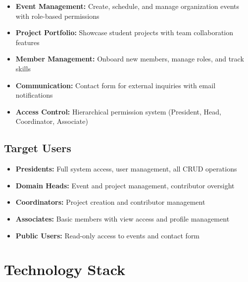 \documentclass[11pt,a4paper]{article}
\begin{document}
\begin{itemize}[leftmargin=*]
    \item \textbf{Event Management:} Create, schedule, and manage organization events with role-based permissions
    \item \textbf{Project Portfolio:} Showcase student projects with team collaboration features
    \item \textbf{Member Management:} Onboard new members, manage roles, and track skills
    \item \textbf{Communication:} Contact form for external inquiries with email notifications
    \item \textbf{Access Control:} Hierarchical permission system (President, Head, Coordinator, Associate)
\end{itemize}

\subsection{Target Users}
\begin{itemize}[leftmargin=*]
    \item \textbf{Presidents:} Full system access, user management, all CRUD operations
    \item \textbf{Domain Heads:} Event and project management, contributor oversight
    \item \textbf{Coordinators:} Project creation and contributor management
    \item \textbf{Associates:} Basic members with view access and profile management
    \item \textbf{Public Users:} Read-only access to events and contact form
\end{itemize}

\section{Technology Stack}
\end{document}
